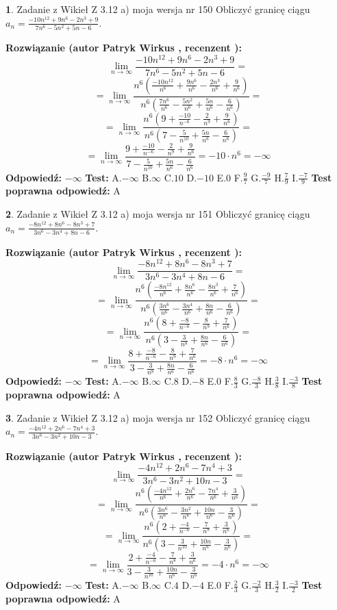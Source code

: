 \documentclass[12pt, a4paper]{article}
\theoremstyle{definition} %
\newtheorem{zad}{}
\newcommand{\zadStart}[1]{\begin{zad}#1\newline}
\newcommand{\zadStop}{\end{zad}}
\newcommand{\rozwStart}[2]{\noindent \textbf{Rozwiązanie (autor #1 , recenzent #2): }\newline}
\newcommand{\rozwStop}{\newline}
\newcommand{\odpStart}{\noindent \textbf{Odpowiedź:}\newline}
\newcommand{\odpStop}{\newline}
\newcommand{\testStart}{\noindent \textbf{Test:}\newline}
\newcommand{\testStop}{\newline}
\newcommand{\kluczStart}{\noindent \textbf{Test poprawna odpowiedź:}\newline}
\newcommand{\kluczStop}{\newline}
\begin{document}
\zadStart{Zadanie z Wikieł Z 3.12 a) moja wersja nr 150}
Obliczyć granicę ciągu $a_{n}=\frac{-10n^{12}+9n^{6}-2n^{3}+9}{7n^{6}-5n^{2}+5n-6}$.
\zadStop
\rozwStart{Patryk Wirkus}{}
$$\lim\limits_{n\to\infty}\frac{-10n^{12}+9n^{6}-2n^{3}+9}{7n^{6}-5n^{2}+5n-6}=$$
$$=\lim\limits_{n\to\infty}\frac{n^{6}\left(\frac{-10n^{12}}{n^{6}}+\frac{9n^{6}}{n^{6}}-\frac{2n^{3}}{n^{6}}+\frac{9}{n^{6}}\right)}{n^{6}\left(\frac{7n^{6}}{n^{6}}-\frac{5n^{2}}{n^{6}}+\frac{5n}{n^{6}}-\frac{6}{n^{6}}\right)}=$$
$$=\lim\limits_{n\to\infty}\frac{n^{6}\left(9+\frac{-10}{n^{-6}}-\frac{2}{n^{9}}+\frac{9}{n^{6}}\right)}
{n^{6}\left(7-\frac{5}{n^{10}}+\frac{5n}{n^{6}}-\frac{6}{n^{6}}\right)}=$$
$$=\lim\limits_{n\to\infty}\frac{9+\frac{-10}{n^{-6}}-\frac{2}{n^{9}}+\frac{9}{n^{6}}}{7-\frac{5}{n^{10}}+\frac{5n}{n^{6}}-\frac{6}{n^{6}}}=-10\cdot n^{6} = -\infty$$
\rozwStop
\odpStart
$-\infty$
\odpStop
\testStart
A.$-\infty$
B.$\infty$
C.$10$
D.$-10$
E.$0$
F.$\frac{9}{7}$
G.$\frac{-9}{7}$
H.$\frac{7}{9}$
I.$\frac{-7}{9}$
\testStop
\kluczStart
A
\kluczStop



\zadStart{Zadanie z Wikieł Z 3.12 a) moja wersja nr 151}
Obliczyć granicę ciągu $a_{n}=\frac{-8n^{12}+8n^{6}-8n^{3}+7}{3n^{6}-3n^{4}+8n-6}$.
\zadStop
\rozwStart{Patryk Wirkus}{}
$$\lim\limits_{n\to\infty}\frac{-8n^{12}+8n^{6}-8n^{3}+7}{3n^{6}-3n^{4}+8n-6}=$$
$$=\lim\limits_{n\to\infty}\frac{n^{6}\left(\frac{-8n^{12}}{n^{6}}+\frac{8n^{6}}{n^{6}}-\frac{8n^{3}}{n^{6}}+\frac{7}{n^{6}}\right)}{n^{6}\left(\frac{3n^{6}}{n^{6}}-\frac{3n^{4}}{n^{6}}+\frac{8n}{n^{6}}-\frac{6}{n^{6}}\right)}=$$
$$=\lim\limits_{n\to\infty}\frac{n^{6}\left(8+\frac{-8}{n^{-6}}-\frac{8}{n^{9}}+\frac{7}{n^{6}}\right)}
{n^{6}\left(3-\frac{3}{n^{8}}+\frac{8n}{n^{6}}-\frac{6}{n^{6}}\right)}=$$
$$=\lim\limits_{n\to\infty}\frac{8+\frac{-8}{n^{-6}}-\frac{8}{n^{9}}+\frac{7}{n^{6}}}{3-\frac{3}{n^{8}}+\frac{8n}{n^{6}}-\frac{6}{n^{6}}}=-8\cdot n^{6} = -\infty$$
\rozwStop
\odpStart
$-\infty$
\odpStop
\testStart
A.$-\infty$
B.$\infty$
C.$8$
D.$-8$
E.$0$
F.$\frac{8}{3}$
G.$\frac{-8}{3}$
H.$\frac{3}{8}$
I.$\frac{-3}{8}$
\testStop
\kluczStart
A
\kluczStop



\zadStart{Zadanie z Wikieł Z 3.12 a) moja wersja nr 152}
Obliczyć granicę ciągu $a_{n}=\frac{-4n^{12}+2n^{6}-7n^{4}+3}{3n^{6}-3n^{2}+10n-3}$.
\zadStop
\rozwStart{Patryk Wirkus}{}
$$\lim\limits_{n\to\infty}\frac{-4n^{12}+2n^{6}-7n^{4}+3}{3n^{6}-3n^{2}+10n-3}=$$
$$=\lim\limits_{n\to\infty}\frac{n^{6}\left(\frac{-4n^{12}}{n^{6}}+\frac{2n^{6}}{n^{6}}-\frac{7n^{4}}{n^{6}}+\frac{3}{n^{6}}\right)}{n^{6}\left(\frac{3n^{6}}{n^{6}}-\frac{3n^{2}}{n^{6}}+\frac{10n}{n^{6}}-\frac{3}{n^{6}}\right)}=$$
$$=\lim\limits_{n\to\infty}\frac{n^{6}\left(2+\frac{-4}{n^{-6}}-\frac{7}{n^{8}}+\frac{3}{n^{6}}\right)}
{n^{6}\left(3-\frac{3}{n^{10}}+\frac{10n}{n^{6}}-\frac{3}{n^{6}}\right)}=$$
$$=\lim\limits_{n\to\infty}\frac{2+\frac{-4}{n^{-6}}-\frac{7}{n^{8}}+\frac{3}{n^{6}}}{3-\frac{3}{n^{10}}+\frac{10n}{n^{6}}-\frac{3}{n^{6}}}=-4\cdot n^{6} = -\infty$$
\rozwStop
\odpStart
$-\infty$
\odpStop
\testStart
A.$-\infty$
B.$\infty$
C.$4$
D.$-4$
E.$0$
F.$\frac{2}{3}$
G.$\frac{-2}{3}$
H.$\frac{3}{2}$
I.$\frac{-3}{2}$
\testStop
\kluczStart
A
\kluczStop
\end{document}
